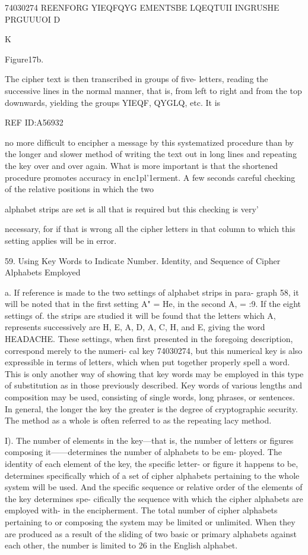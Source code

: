 {{{ 

 

74030274
REENFORG
YIEQFQYG
EMENTSBE
LQEQTUII
INGRUSHE
PRGUUUOI
D

K

Figure17b.

The cipher text is then transcribed in groups of ﬁve- letters, reading
the successive lines in the normal manner, that is, from left to right and
from the top downwards, yielding the groups YIEQF, QYGLQ, etc. It is

 

REF ID:A56932

no more difﬁcult to encipher a message by this systematized procedure
than by the longer and slower method of writing the text out in long
lines and repeating the key over and over again. What is more important
is that the shortened procedure promotes accuracy in enc1pl'1erment. A
few seconds careful checking of the relative positions in which the two

alphabet strips are set is all that is required but this checking is very'

necessary, for if that is wrong all the cipher letters in that column to
which this setting applies will be in error.

59. Using Key Words to Indicate Number. Identity, and
Sequence of Cipher Alphabets Employed

a. If reference is made to the two settings of alphabet strips in para-
graph 58, it will be noted that in the ﬁrst setting A" = He, in the second
A, = :9. If the eight settings of. the strips are studied it will be found
that the letters which A, represents successively are H, E, A, D, A, C,
H, and E, giving the word HEADACHE. These settings, when ﬁrst
presented in the foregoing description, correspond merely to the numeri-
cal key 74030274, but this numerical key is also expressible in terms of
letters, which when put together properly spell a word. This is only
another way of showing that key words may be employed in this type of
substitution as in those previously described. Key words of various
lengths and composition may be used, consisting of single words, long
phrases, or sentences. In general, the longer the key the greater is the
degree of cryptographic security. The method as a whole is often
referred to as the repeating lacy method.

I). The number of elements in the key—that is, the number of letters
or ﬁgures composing it——determines the number of alphabets to be em-
ployed. The identity of each element of the key, the speciﬁc letter- or
ﬁgure it happens to be, determines speciﬁcally which of a set of cipher
alphabets pertaining to the whole system will be used. And the speciﬁc
sequence or relative order of the elements of the key determines spe-
ciﬁcally the sequence with which the cipher alphabets are employed with-
in the encipherment. The total number of cipher alphabets pertaining to
or composing the system may be limited or unlimited. When they are
produced as a result of the sliding of two basic or primary alphabets
against each other, the number is limited to 26 in the English alphabet.

}}}
